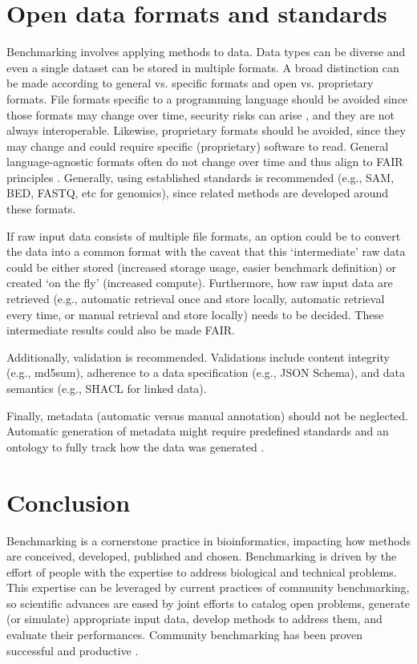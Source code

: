\documentclass[11pt]{article}
\begin{document}
\section*{Open data formats and standards}

Benchmarking involves applying methods to data. Data types can be diverse and even a single dataset can be stored in multiple formats. A broad distinction can be made according to general vs. specific formats and open vs. proprietary formats. File formats specific to a programming language should be avoided since those formats may change over time, security risks can arise \cite{Huynh2023-pq, Bleih2024-lv}, and they are not always interoperable. Likewise, proprietary formats should be avoided, since they may change and could require specific (proprietary) software to read. General language-agnostic formats often do not change over time and thus align to FAIR principles \cite{Wilkinson2016-bh}. Generally, using established standards is recommended (e.g., SAM, BED, FASTQ, etc for genomics), since related methods are developed around these formats.

If raw input data consists of multiple file formats, an option could be to convert the data into a common format with the caveat that this `intermediate' raw data could be either stored (increased storage usage, easier benchmark definition) or created `on the fly' (increased compute). Furthermore, how raw input data are retrieved (e.g., automatic retrieval once and store locally, automatic retrieval every time, or manual retrieval and store locally) needs to be decided. These intermediate results could also be made FAIR.

Additionally, validation is recommended. Validations include content integrity (e.g., md5sum), adherence to a data specification (e.g., JSON Schema), and data semantics (e.g., SHACL for linked data). 

Finally, metadata (automatic versus manual annotation) should not be neglected. Automatic generation of metadata might require predefined standards and an ontology to fully track how the data was generated \cite{LeboUnknown-om}. 

\section*{Conclusion}
\label{sec:conclusion}

Benchmarking is a cornerstone practice in bioinformatics, impacting how methods are conceived, developed, published and chosen. Benchmarking is driven by the effort of people with the expertise to address biological and technical problems. This expertise can be leveraged by current practices of community benchmarking, so scientific advances are eased by joint efforts to catalog open problems, generate (or simulate) appropriate input data, develop methods to address them, and evaluate their performances. Community benchmarking has been proven successful and  productive \cite{moult2005-ne,Capella-Gutierrez2017-dh,Luecken2024-fk}.
\end{document}
